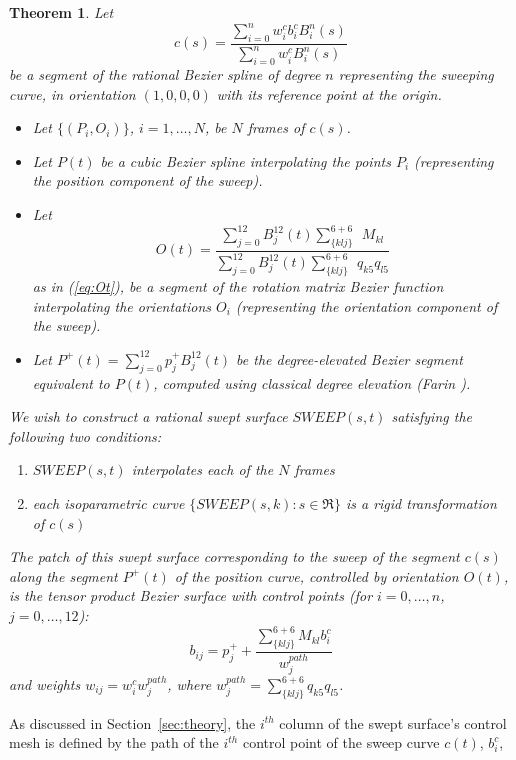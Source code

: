 \documentclass[times]{article}
\newcommand{\prf}{\noindent{{\bf Proof} :\ }}
\newtheorem{theorem}{Theorem}[section]
\begin{document}
\begin{theorem}
\label{thm:ten1}
Let
\[
c(s) = \frac{\sum_{i=0}^n w_i^{c} b_i^{c} B_i^n(s)}
	    {\sum_{i=0}^n w_i^{c} B_i^n(s)}
\]
be a segment of the rational Bezier spline of degree $n$
representing the sweeping curve, in orientation $(1,0,0,0)$
with its reference point at the origin.
\begin{itemize}
\item
Let $\{(P_i,O_i)\}$, $i=1,\ldots,N$, be $N$ frames of $c(s)$.
\item
Let $P(t)$ be a cubic Bezier spline interpolating the points $P_i$
(representing the position component of the sweep).
\item
Let 
\[
O(t) = \frac{\sum_{j=0}^{12} B_j^{12}(t) \sum_{\{klj\}}^{6+6}\ \ M_{kl}}
	    {\sum_{j=0}^{12} B_j^{12}(t) \sum_{\{klj\}}^{6+6} \ \ q_{k5}q_{l5}}
\]
as in (\ref{eq:Ot}),
be a segment of the rotation matrix Bezier function
interpolating the orientations $O_i$ 
(representing the orientation component of the sweep).
\item
Let $P^{+}(t) = \sum_{j=0}^{12} p_j^{+} B_j^{12}(t)$
be the degree-elevated Bezier segment equivalent to $P(t)$, 
computed using classical degree elevation (Farin \cite{farin93}).
\end{itemize}

We wish to construct a rational swept surface $SWEEP(s,t)$ satisfying 
the following two conditions:
\begin{enumerate}
\item $SWEEP(s,t)$ interpolates each of the $N$ frames
\item each isoparametric curve $\{SWEEP(s,k) : s \in \Re \}$
	is a rigid transformation of $c(s)$
\end{enumerate}
The patch of this swept surface corresponding to the sweep of the segment
$c(s)$ along the segment $P^{+}(t)$ of the position curve, controlled 
by orientation $O(t)$, is the tensor product Bezier surface with control points
(for $i=0,\ldots,n$, $j=0,\ldots,12$):
\[
b_{ij} = p_j^{+} + \frac{\sum_{\{klj\}}^{6+6} M_{kl} b_i^{c}}{w_j^{path}}
\]
and weights $w_{ij} = w_i^{c}  w_j^{path}$,
where $w_j^{path} = \sum_{\{klj\}}^{6+6} q_{k5} q_{l5}$.
\end{theorem}
\prf
As discussed in Section~\ref{sec:theory},
the $i^{th}$ column of the swept surface's control mesh is defined by
the path of the $i^{th}$ control point of the sweep curve $c(t)$, $b_i^{c}$, 
\end{document}
